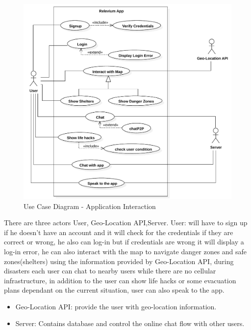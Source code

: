 \documentclass{scrreprt}
\begin{document}

\clearpage

\begin{figure}[ht!]
    \centering
    \includegraphics[width=\textwidth]{img2/UseCaseDiagram1.pdf}
    \caption{Use Case Diagram - Application Interaction}
    \label{fig:usecase1}
\end{figure}

There are three actors User, Geo-Location API,Server. User: will have to sign up if he doesn't have an account and it will check for the credentials if they are correct or wrong, he also can log-in but if credentials are wrong it will display a log-in error,
he can also interact with the map to navigate danger zones and safe zones(shelters) using the information provided by Geo-Location API, during disasters each user can chat to nearby users while there are no cellular infrastructure, in addition to the user can show life hacks or some evacuation plans dependant on the current situation, user can also speak to the app.
\begin{itemize}
    \item Geo-Location API: provide the user with geo-location information.
    \item Server: Contains database and control the online chat flow with other users.
\end{itemize}
\end{document}
